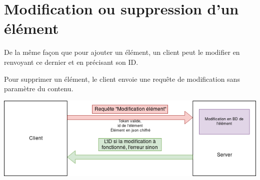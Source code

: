 \documentclass[oneside]{report}
\begin{document}
	\section{Modification ou suppression d'un élément}{
		\par De la même façon que pour ajouter un élément, un client peut le modifier en renvoyant ce dernier et en précisant son ID.
		\par Pour supprimer un élément, le client envoie une requête de modification sans paramètre du contenu.
		\begin{center}
			\includegraphics[scale=.5]{reseau_update_elt}
		\end{center}
	}
\end{document}
